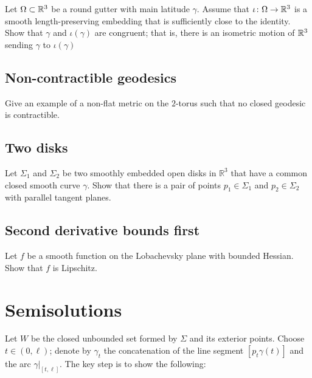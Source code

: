 \begin{pr}
Let $\Omega\subset \mathbb{R}^3$ be a round gutter with main latitude $\gamma$. 
Assume that $\iota\:\Omega\z\to\RR^3$ 
is a smooth length-preserving embedding that is sufficiently close to the identity.
Show that $\gamma$ and $\iota(\gamma)$ are congruent;
that is, there is an isometric motion of $\mathbb{R}^3$ sending $\gamma$ to $\iota(\gamma)$
\end{pr}



\subsection*{Non-contractible geodesics}
\label{torus}

\begin{pr}
Give an example of a non-flat metric 
on the $2$-torus such that no closed geodesic is contractible.
\end{pr}


\subsection*{Two disks}
\label{Two disks}

\begin{pr}
Let $\Sigma_1$ and $\Sigma_2$ be two smoothly embedded open disks in $\mathbb R^3$ 
that have a common closed smooth curve $\gamma$.
Show that there is a pair of points  $p_1\in \Sigma_1$ and $p_2\in \Sigma_2$ with parallel tangent planes.
\end{pr}

\subsection*{Second derivative bounds first\easy}
\label{Second derivative bounds first}

\begin{pr}
Let $f$ be a smooth function on the Lobachevsky plane with bounded Hessian.
Show that $f$ is Lipschitz.
\end{pr}


\section*{Semisolutions}
Let $W$ be the closed unbounded set formed by $\Sigma$ and its exterior points.
Choose $t\in (0,\ell)$;
denote by $\gamma_t$ the concatenation of the line segment $[p_t\gamma(t)]$ and the arc $\gamma|_{[t,\ell]}$.
The key step is to show the following:

